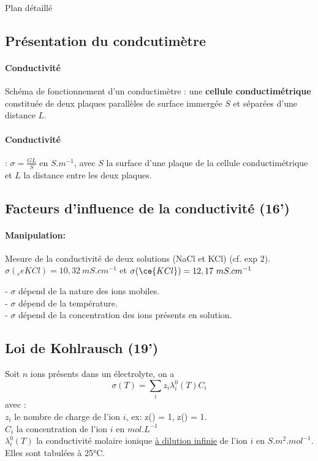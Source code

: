 \begin{reportBlock}{Plan détaillé}
\subsection{Présentation du condcutimètre}

\paragraph*{Conductivité} Schéma de fonctionnement d'un conductimètre : une \textbf{cellule conductimétrique} constituée de deux plaques parallèles de surface immergée $S$ et séparées d'une distance $L$. \\

\paragraph*{Conductivité}: $\sigma = \frac{G L}{S}$ en $S.m^{-1}$, avec $S$ la surface d'une plaque de la cellule conductimétrique et $L$ la distance entre les deux plaques.


\subsection{Facteurs d'influence de la conductivité (16')}

\paragraph*{Manipulation: } Mesure de la conductivité de deux solutions (NaCl et KCl) (cf. exp 2). $\sigma(_ce{KCl}) = 10,32~mS.cm^{-1}$ et $\sigma(\ce{KCl}) = 12,17~mS.cm^{-1}$

- $\sigma$ dépend de la nature des ions mobiles. \\
- $\sigma$ dépend de la température.\\
- $\sigma$ dépend de la concentration des ions présents en solution.

\subsection{Loi de Kohlrausch (19')}

Soit $n$ ions présents dans un électrolyte, on a 
\begin{equation}
\sigma(T) = \sum_i z_i \lambda_i^0(T) C_i
\end{equation}
avec : \\
$z_i$ le nombre de charge de l'ion $i$, ex: z() = 1, z() = 1. \\
$C_i$ la concentration de l'ion $i$ en $mol.L^{-1}$  \\
$\lambda_i^0(T)$ la conductivité molaire ionique \color{purple} \underline{à dilution infinie} \color{black} de l'ion $i$ en $S.m^2.mol^{-1}$. Elles sont tabulées à 25°C.



\end{reportBlock}
